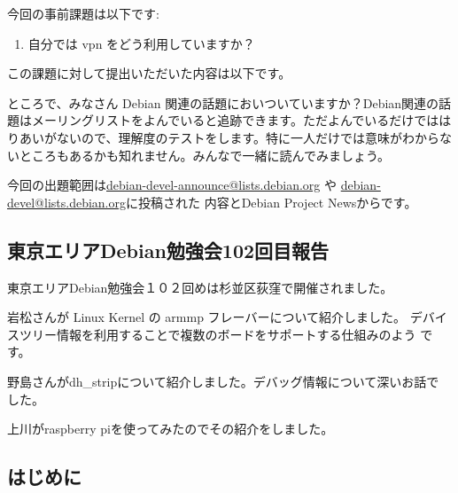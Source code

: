 \documentclass[mingoth,a4paper]{jsarticle}
\begin{document}

今回の事前課題は以下です:
\begin{enumerate}
 \item 自分では vpn をどう利用していますか？
\end{enumerate}
この課題に対して提出いただいた内容は以下です。
\begin{multicols}{2}
{\small
 
}
\end{multicols}


ところで、みなさん Debian 関連の話題においついていますか？Debian関連の話
題はメーリングリストをよんでいると追跡できます。ただよんでいるだけではは
りあいがないので、理解度のテストをします。特に一人だけでは意味がわからな
いところもあるかも知れません。みんなで一緒に読んでみましょう。

今回の出題範囲は\url{debian-devel-announce@lists.debian.org} や \url{debian-devel@lists.debian.org}に投稿された
内容とDebian Project Newsからです。

\begin{multicols}{2}
 
\end{multicols}

\subsection{東京エリアDebian勉強会102回目報告}

東京エリアDebian勉強会１０２回めは杉並区荻窪で開催されました。

岩松さんが Linux Kernel の armmp フレーバーについて紹介しました。
デバイスツリー情報を利用することで複数のボードをサポートする仕組みのよう
です。

野島さんがdh\_stripについて紹介しました。デバッグ情報について深いお話で
した。

上川がraspberry piを使ってみたのでその紹介をしました。



\subsection{はじめに}
\end{document}
